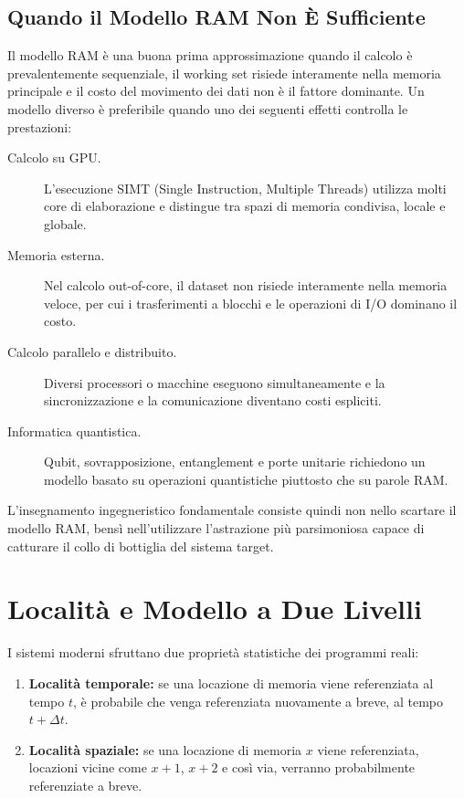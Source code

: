 \FloatBarrier
\subsection{Quando il Modello RAM Non È Sufficiente}

Il modello RAM è una buona prima approssimazione quando il calcolo è prevalentemente sequenziale, il working set risiede interamente nella memoria principale e il costo del movimento dei dati non è il fattore dominante. Un modello diverso è preferibile quando uno dei seguenti effetti controlla le prestazioni:

\begin{description}
  \item[Calcolo su GPU.] L'esecuzione SIMT (Single Instruction, Multiple Threads) utilizza molti core di elaborazione e distingue tra spazi di memoria condivisa, locale e globale.
  \item[Memoria esterna.] Nel calcolo out-of-core, il dataset non risiede interamente nella memoria veloce, per cui i trasferimenti a blocchi e le operazioni di I/O dominano il costo.
  \item[Calcolo parallelo e distribuito.] Diversi processori o macchine eseguono simultaneamente e la sincronizzazione e la comunicazione diventano costi espliciti.
  \item[Informatica quantistica.] Qubit, sovrapposizione, entanglement e porte unitarie richiedono un modello basato su operazioni quantistiche piuttosto che su parole RAM.
\end{description}

L'insegnamento ingegneristico fondamentale consiste quindi non nello scartare il modello RAM, bens\`i nell'utilizzare l'astrazione pi\`u parsimoniosa capace di catturare il collo di bottiglia del sistema target.

\FloatBarrier
\section{Localit\`a e Modello a Due Livelli}
\label{sec:external-memory}

I sistemi moderni sfruttano due proprietà statistiche dei programmi reali:

\begin{enumerate}
  \item \textbf{Località temporale:} se una locazione di memoria viene referenziata al tempo $t$, è probabile che venga referenziata nuovamente a breve, al tempo $t + \Delta t$.
  \item \textbf{Località spaziale:} se una locazione di memoria $x$ viene referenziata, locazioni vicine come $x+1$, $x+2$ e così via, verranno probabilmente referenziate a breve.
\end{enumerate}

